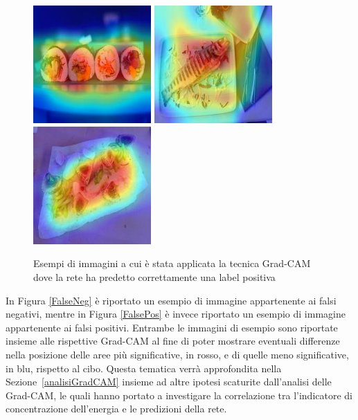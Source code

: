 \begin{figure}[H]
\centering
\includegraphics[height=45mm]{images/gradcam53.jpg}
\quad
\includegraphics[height=45mm]{images/gradcam85.jpg}
\quad
\includegraphics[height=45mm]{images/gradcam28.jpg}
\quad
\caption{Esempi di immagini a cui è stata applicata la tecnica Grad-CAM dove la rete ha predetto correttamente una label positiva}
\label{gradcam_pos}
\end{figure}

In Figura \ref{FalseNeg} è riportato un esempio di immagine appartenente ai falsi negativi, mentre in Figura \ref{FalsePos} è invece riportato un esempio di immagine appartenente ai falsi positivi. Entrambe le immagini di esempio sono riportate insieme alle rispettive Grad-CAM al fine di poter mostrare eventuali differenze nella posizione delle aree più significative, in rosso, e di quelle meno significative, in blu, rispetto al cibo. Questa tematica verrà approfondita nella Sezione~\ref{analisiGradCAM} insieme ad altre ipotesi scaturite dall'analisi delle Grad-CAM, le quali hanno portato a investigare la correlazione tra l'indicatore di concentrazione dell'energia e le predizioni della rete.

